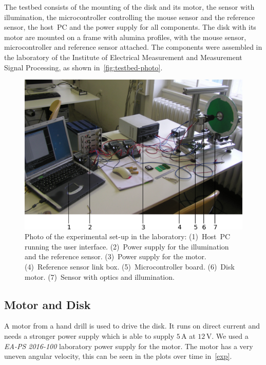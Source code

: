 \documentclass[12pt,a4paper]{article}
\newcommand{\EMT}{Institute of Electrical Measurement and Measurement Signal Processing}
\begin{document}
The testbed consists of the mounting of the disk and its motor, the sensor with illumination, the microcontroller controlling the mouse sensor and the reference sensor, the host~PC and the power supply for all components.
The disk with its motor are mounted on a frame with alumina profiles, with the mouse sensor, microcontroller and reference sensor attached.
The components were assembled in the laboratory of the \EMT, as shown in~\autoref{fig:testbed-photo}.

\begin{figure}[htbp]
\begin{center}
\includegraphics[width=\textwidth]{figures/testbed-photo.pdf}
\caption{\label{fig:testbed-photo}
Photo of the experimental set-up in the laboratory:
(1)~Host~PC running the user interface.
(2)~Power supply for the illumination and the reference sensor.
(3)~Power supply for the motor.
(4)~Reference sensor link box.
(5)~Microcontroller board.
(6)~Disk motor.
(7)~Sensor with optics and illumination.
}
\end{center}
\end{figure}





\subsection{Motor and Disk}

A motor from a hand drill is used to drive the disk.
It runs on direct current and needs a stronger power supply which is able to supply $5\,$A at $12\,$V.
We used a \emph{EA-PS 2016-100} laboratory power supply for the motor.
The motor has a very uneven angular velocity, this can be seen in the plots over time in~\autoref{exp}.
\end{document}
